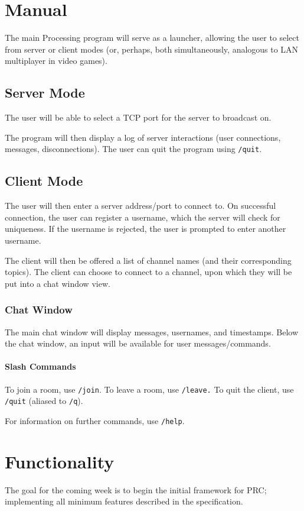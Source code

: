 \documentclass{article}
\begin{document}
\section{Manual}
The main Processing program will serve as a launcher, allowing the user to select from server or client modes (or, perhaps, both simultaneously, analogous to LAN multiplayer in video games).

\subsection{Server Mode}
The user will be able to select a TCP port for the server to broadcast on.

The program will then display a log of server interactions (user connections, messages, disconnections). The user can quit the program using \verb|/quit|.

\subsection{Client Mode}
The user will then enter a server address/port to connect to. On successful connection, the user can register a username, which the server will check for uniqueness. If the username is rejected, the user is prompted to enter another username.

The client will then be offered a list of channel names (and their corresponding topics). The client can choose to connect to a channel, upon which they will be put into a chat window view.


\subsubsection{Chat Window}
The main chat window will display messages, usernames, and timestamps. Below the chat window, an input will be available for user messages/commands.

\paragraph{Slash Commands}
To join a room, use \verb|/join|. To leave a room, use \verb|/leave.| To quit the client, use \verb|/quit| (aliased to \verb|/q|).

For information on further commands, use \verb|/help|.

\section{Functionality}
The goal for the coming week is to begin the initial framework for PRC; implementing all minimum features described in the specification.
\end{document}
